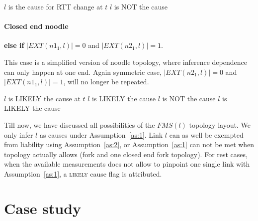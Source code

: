 \begin{algorithmic}
	\State $l$ is the cause for RTT change at $t$ 
\Else
	\State $l$ is NOT the cause
\EndIf
\end{algorithmic}

\paragraph{Closed end noodle} \textbf{else if } $|EXT(n1_1,l)| = 0$ and $|EXT(n2_1,l)| = 1$.

This case is a simplified version of noodle topology, where inference dependence can only happen at one end.
Again symmetric case, $|EXT(n2_1,l)| = 0$ and $|EXT(n1_1,l)| = 1$, will no longer be repeated.

\begin{algorithmic}
	\State $l$ is LIKELY the cause at $t$ 
\Else {}
		\State $l$ is LIKELY the cause 
	\Else
			\State $l$ is NOT the cause 
		\Else
			\State $l$ is LIKELY the cause 
		\EndIf
	\EndIf
\EndIf
\end{algorithmic}

Till now, we have discussed all possibilities of the $FMS(l)$ topology layout. We only infer $l$ as causes under Assumption~\ref{as:1}. Link $l$ can as well be exempted from liability using Assumption~\ref{as:2}, or Assumption~\ref{as:1} can not be met when topology actually allows (fork and one closed end fork topology). For rest cases, when the available measurements does not allow to pinpoint one single link with Assumption~\ref{as:1}, a \textsc{likely} cause flag is attributed.

\section{Case study}


